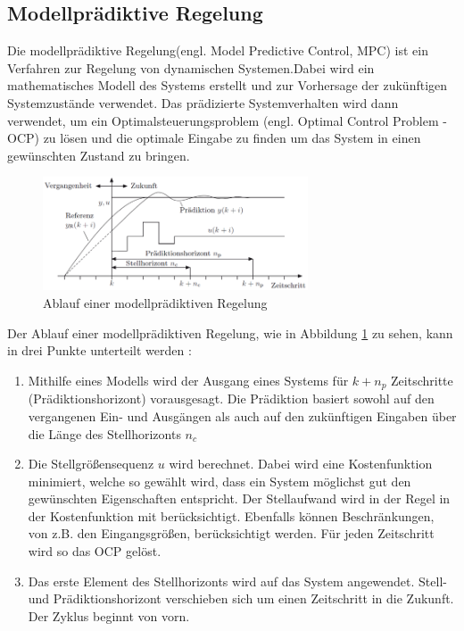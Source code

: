 \subsection{Modellprädiktive Regelung}
Die modellprädiktive Regelung(engl. Model Predictive Control, MPC) ist ein Verfahren zur Regelung von dynamischen Systemen.Dabei wird ein mathematisches Modell des Systems erstellt und zur Vorhersage der zukünftigen Systemzustände verwendet. Das prädizierte Systemverhalten wird dann verwendet, um ein Optimalsteuerungsproblem (engl. Optimal Control Problem - OCP) zu lösen und die optimale Eingabe zu finden um das System in einen gewünschten Zustand zu bringen.
\begin{figure}
    \centering
    \includegraphics[width=0.7\textwidth]{figures/2_Grundlagen/MPC_Diagramm.png}
    \caption{Ablauf einer modellprädiktiven Regelung \cite{adamy2014}}
    \label{fig:MPC}
\end{figure}
Der Ablauf einer modellprädiktiven Regelung, wie in Abbildung \ref{fig:MPC} zu sehen, kann in drei Punkte unterteilt werden \cite{camacho2013model}:
\begin{enumerate}
    \item Mithilfe eines Modells wird der Ausgang eines Systems für $k+n_{p}$ Zeitschritte (Prädiktionshorizont) vorausgesagt. Die Prädiktion basiert sowohl auf den vergangenen Ein- und Ausgängen als auch auf den zukünftigen Eingaben über die Länge des Stellhorizonts $n_{c}$
    \item Die Stellgrößensequenz $u$ wird berechnet. Dabei wird eine Kostenfunktion minimiert, welche so gewählt wird, dass ein System möglichst gut den gewünschten Eigenschaften entspricht. Der Stellaufwand wird in der Regel in der Kostenfunktion mit berücksichtigt. Ebenfalls können Beschränkungen, von z.B. den Eingangsgrößen, berücksichtigt werden. Für jeden Zeitschritt wird so das OCP gelöst.
    \item Das erste Element des Stellhorizonts wird auf das System angewendet. Stell- und Prädiktionshorizont verschieben sich um einen Zeitschritt in die Zukunft. Der Zyklus beginnt von vorn. 
\end{enumerate}
